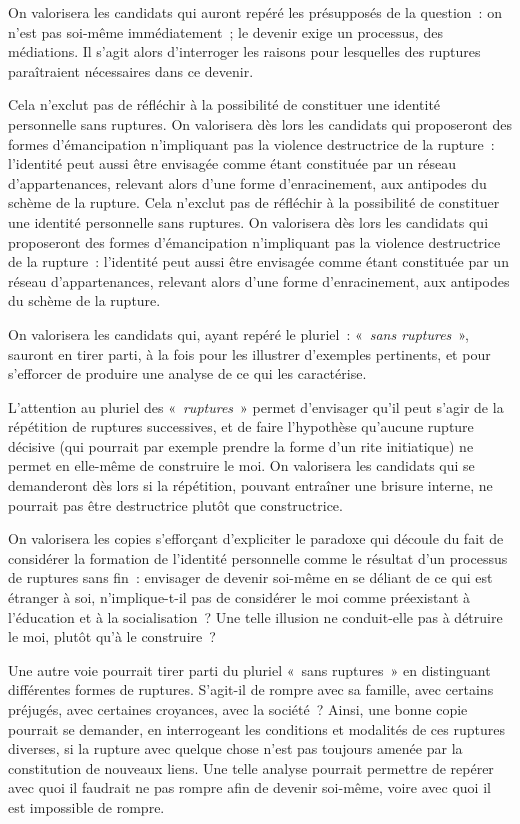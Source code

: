 		{On valorisera les candidats qui auront repéré les présupposés de la question~:
on n'est pas soi-même immédiatement~; le devenir exige un processus, des
médiations. Il s'agit alors d'interroger les raisons pour lesquelles des ruptures
paraîtraient nécessaires dans ce devenir.

Cela n'exclut pas de réfléchir à la possibilité de constituer une identité
personnelle sans ruptures. On valorisera dès lors les candidats qui proposeront des
formes d'émancipation n'impliquant pas la violence destructrice de la rupture~: l'identité
peut aussi être envisagée comme étant constituée par un réseau d'appartenances,
relevant alors d'une forme d'enracinement, aux antipodes du schème de la rupture.		
Cela n'exclut pas de réfléchir à la possibilité de constituer une identité
personnelle sans ruptures. On valorisera dès lors les candidats qui proposeront des
formes d'émancipation n'impliquant pas la violence destructrice de la rupture~: l'identité
peut aussi être envisagée comme étant constituée par un réseau d'appartenances,
relevant alors d'une forme d'enracinement, aux antipodes du schème de la rupture.

On valorisera les candidats qui, ayant repéré le pluriel~: «~\emph{sans ruptures}~»,
sauront en tirer parti, à la fois pour les illustrer d'exemples pertinents, et pour s'efforcer
de produire une analyse de ce qui les caractérise.

L'attention au pluriel des «~\emph{ruptures}~» permet d'envisager qu'il peut s'agir de la
répétition de ruptures successives, et de faire l'hypothèse qu'aucune rupture décisive
(qui pourrait par exemple prendre la forme d'un rite initiatique) ne permet en elle-même
de construire le moi. On valorisera les candidats qui se demanderont dès lors si la
répétition, pouvant entraîner une brisure interne, ne pourrait pas être destructrice plutôt
que constructrice.

On valorisera les copies s'efforçant d'expliciter le paradoxe qui découle du fait
de considérer la formation de l'identité personnelle comme le résultat d'un processus
de ruptures sans fin~: envisager de devenir soi-même en se déliant de ce qui est
étranger à soi, n'implique-t-il pas de considérer le moi comme préexistant à l'éducation et à la socialisation~? Une telle illusion ne conduit-elle pas à détruire le moi, plutôt qu'à
le construire~?

Une autre voie pourrait tirer parti du pluriel «~sans ruptures~» en distinguant
différentes formes de ruptures. S'agit-il de rompre avec sa famille, avec certains
préjugés, avec certaines croyances, avec la société~? Ainsi, une bonne copie pourrait
se demander, en interrogeant les conditions et modalités de ces ruptures diverses, si
la rupture avec quelque chose n'est pas toujours amenée par la constitution de
nouveaux liens. Une telle analyse pourrait permettre de repérer avec quoi il faudrait
ne pas rompre afin de devenir soi-même, voire avec quoi il est impossible de rompre.

}
